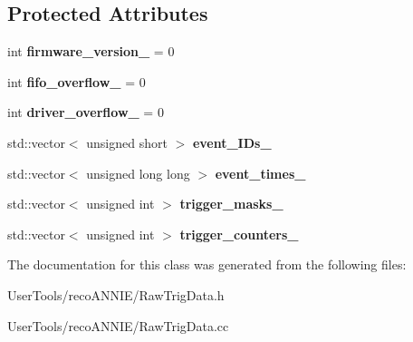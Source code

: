 \subsection*{Protected Attributes}
\begin{DoxyCompactItemize}
\item 
\hypertarget{classannie_1_1RawTrigData_af40ecbe0420f8bc6e91d3f6e8f8c5217}{
int {\bfseries firmware\_\-version\_\-} = 0}
\label{classannie_1_1RawTrigData_af40ecbe0420f8bc6e91d3f6e8f8c5217}

\item 
\hypertarget{classannie_1_1RawTrigData_ab5fe9735027e327199ca1b691bf02505}{
int {\bfseries fifo\_\-overflow\_\-} = 0}
\label{classannie_1_1RawTrigData_ab5fe9735027e327199ca1b691bf02505}

\item 
\hypertarget{classannie_1_1RawTrigData_a157b3599c9ea6b8c1b49c9a0a6df553d}{
int {\bfseries driver\_\-overflow\_\-} = 0}
\label{classannie_1_1RawTrigData_a157b3599c9ea6b8c1b49c9a0a6df553d}

\item 
\hypertarget{classannie_1_1RawTrigData_a8393681826fec79124840fe25d0407c7}{
std::vector$<$ unsigned short $>$ {\bfseries event\_\-IDs\_\-}}
\label{classannie_1_1RawTrigData_a8393681826fec79124840fe25d0407c7}

\item 
\hypertarget{classannie_1_1RawTrigData_a0de9cca76c8ffdf0cc7e0359f4fdba69}{
std::vector$<$ unsigned long long $>$ {\bfseries event\_\-times\_\-}}
\label{classannie_1_1RawTrigData_a0de9cca76c8ffdf0cc7e0359f4fdba69}

\item 
\hypertarget{classannie_1_1RawTrigData_a415d54d089f663f6fd5fd38e2ee5dfdb}{
std::vector$<$ unsigned int $>$ {\bfseries trigger\_\-masks\_\-}}
\label{classannie_1_1RawTrigData_a415d54d089f663f6fd5fd38e2ee5dfdb}

\item 
\hypertarget{classannie_1_1RawTrigData_a7e7333a790cce96d233b670e4bb085cb}{
std::vector$<$ unsigned int $>$ {\bfseries trigger\_\-counters\_\-}}
\label{classannie_1_1RawTrigData_a7e7333a790cce96d233b670e4bb085cb}

\end{DoxyCompactItemize}


The documentation for this class was generated from the following files:\begin{DoxyCompactItemize}
\item 
UserTools/recoANNIE/RawTrigData.h\item 
UserTools/recoANNIE/RawTrigData.cc\end{DoxyCompactItemize}
